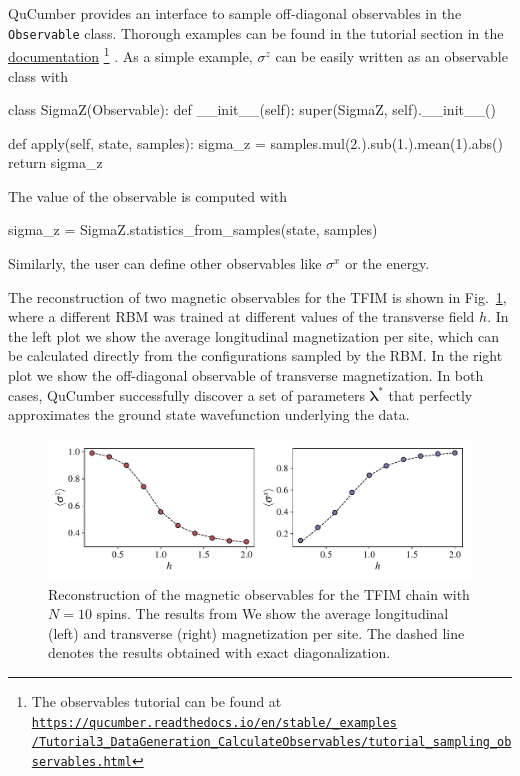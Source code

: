 \documentclass[submission, Phys, hidelinks]{SciPost}
\begin{document}
QuCumber provides an interface to sample off-diagonal observables in the \verb|Observable| class. Thorough examples can be found in the tutorial section in the \href{https://qucumber.readthedocs.io/en/stable/}{documentation}
\footnote{The observables tutorial can be found at 
    \href{https://qucumber.readthedocs.io/en/stable/\_examples/Tutorial3\_DataGeneration\_CalculateObservables/tutorial\_sampling\_observables.html
}{\texttt{https://qucumber.readthedocs.io/en/stable/\_examples\\/Tutorial3\_DataGeneration\_CalculateObservables/tutorial\_sampling\_observables.html}}
}
. As a simple example, $\sigma^z$ can be easily written as an observable class with
\begin{python}
class SigmaZ(Observable):
	def __init__(self):
		super(SigmaZ, self).__init__()

	def apply(self, state, samples):
		sigma_z = samples.mul(2.).sub(1.).mean(1).abs()
		return sigma_z
\end{python}
The value of the observable is computed with 
\begin{python}
sigma_z = SigmaZ.statistics_from_samples(state, samples)
\end{python}
Similarly, the user can define other observables like $\sigma^x$ or the energy. 

The reconstruction of two magnetic observables for the TFIM is shown in Fig.~\ref{tfim_magn}, where a different RBM was trained at different values of the transverse field $h$. In the left plot we show the average longitudinal magnetization per site, which can be calculated directly from the configurations sampled by the RBM. In the right plot we show the off-diagonal observable of transverse magnetization. In both cases, QuCumber successfully discover a set of parameters $\bm{\lambda}^*$ that perfectly approximates the ground state wavefunction underlying the data.

\begin{figure}[htb]
    \centering{}
    \includegraphics[width=\columnwidth]{plots/obs.pdf}
    \caption{\label{tfim_magn} Reconstruction of the magnetic observables for the TFIM chain with $N=10$ spins. The results from We show the average longitudinal (left) and transverse (right) magnetization per site. The dashed line denotes the results obtained with exact diagonalization.}
\end{figure}
\end{document}
